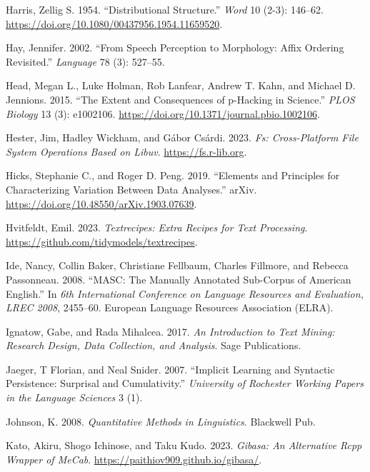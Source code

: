 \documentclass[
  letterpaper,
  DIV=11,
  numbers=noendperiod]{scrreprt}
\newlength{\cslhangindent}
\newenvironment{CSLReferences}[2] %
 {\begin{list}{}{%
  \setlength{\itemindent}{0pt}
  \setlength{\leftmargin}{0pt}
  \setlength{\parsep}{0pt}
  \ifodd #1
   \setlength{\leftmargin}{\cslhangindent}
   \setlength{\itemindent}{-1\cslhangindent}
  \fi
  \setlength{\itemsep}{#2\baselineskip}}}
 {\end{list}}
\theoremstyle{definition}
\theoremstyle{remark}
\begin{document}
\begin{CSLReferences}{1}{0}
Harris, Zellig S. 1954. {``Distributional Structure.''} \emph{Word} 10
(2-3): 146--62. \url{https://doi.org/10.1080/00437956.1954.11659520}.

Hay, Jennifer. 2002. {``From Speech Perception to Morphology: Affix
Ordering Revisited.''} \emph{Language} 78 (3): 527--55.

Head, Megan L., Luke Holman, Rob Lanfear, Andrew T. Kahn, and Michael D.
Jennions. 2015. {``The Extent and Consequences of p-Hacking in
Science.''} \emph{PLOS Biology} 13 (3): e1002106.
\url{https://doi.org/10.1371/journal.pbio.1002106}.

Hester, Jim, Hadley Wickham, and Gábor Csárdi. 2023. \emph{Fs:
Cross-Platform File System Operations Based on Libuv}.
\url{https://fs.r-lib.org}.

Hicks, Stephanie C., and Roger D. Peng. 2019. {``Elements and Principles
for Characterizing Variation Between Data Analyses.''} arXiv.
\url{https://doi.org/10.48550/arXiv.1903.07639}.

Hvitfeldt, Emil. 2023. \emph{Textrecipes: Extra Recipes for Text
Processing}. \url{https://github.com/tidymodels/textrecipes}.

Ide, Nancy, Collin Baker, Christiane Fellbaum, Charles Fillmore, and
Rebecca Passonneau. 2008. {``MASC: The Manually Annotated Sub-Corpus of
American English.''} In \emph{6th International Conference on Language
Resources and Evaluation, LREC 2008}, 2455--60. European Language
Resources Association (ELRA).

Ignatow, Gabe, and Rada Mihalcea. 2017. \emph{An Introduction to Text
Mining: Research Design, Data Collection, and Analysis}. Sage
Publications.

Jaeger, T Florian, and Neal Snider. 2007. {``Implicit Learning and
Syntactic Persistence: Surprisal and Cumulativity.''} \emph{University
of Rochester Working Papers in the Language Sciences} 3 (1).

Johnson, K. 2008. \emph{Quantitative Methods in Linguistics}. Blackwell
Pub.

Kato, Akiru, Shogo Ichinose, and Taku Kudo. 2023. \emph{Gibasa: An
Alternative Rcpp Wrapper of MeCab}.
\url{https://paithiov909.github.io/gibasa/}.


\end{CSLReferences}
\end{document}
